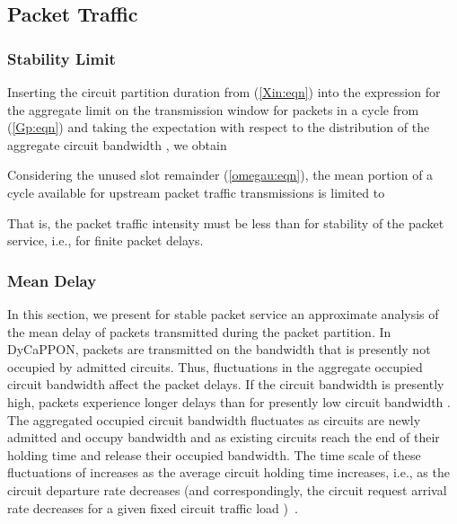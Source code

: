 \documentclass[article]{IEEEtran}
\begin{document}
\subsection{Packet Traffic}
\label{pkt_perf:sec}
\subsubsection{Stability Limit}
\label{pastab:sec}
Inserting the circuit partition duration  from (\ref{Xin:eqn})
into the expression for the aggregate limit  on the
transmission window for packets in a cycle from (\ref{Gp:eqn})
and taking the expectation  with respect to the distribution
of the aggregate circuit bandwidth , we obtain

Considering the unused slot remainder  (\ref{omegau:eqn}),
the mean portion of a cycle available for
upstream packet traffic transmissions is limited to

That is, the packet traffic intensity  must be less than
 for stability of the packet service, i.e.,
for finite packet delays.

\subsubsection{Mean Delay}
\label{delan:sec}
In this section, we present for stable packet service
an approximate analysis of the mean delay  of packets
transmitted during the packet partition.
In DyCaPPON, packets are transmitted on the bandwidth
that is presently not occupied by admitted circuits.
Thus, fluctuations in the aggregate occupied circuit bandwidth 
affect the packet delays.
If the circuit bandwidth  is presently high,
packets experience longer delays than for presently low
circuit bandwidth .
The aggregated occupied circuit bandwidth  fluctuates
as circuits are newly admitted and occupy bandwidth and as
existing circuits reach the end of their holding time and release
their occupied bandwidth.
The time scale of these fluctuations of  increases
as the average circuit holding time  increases,
i.e., as the circuit departure rate  decreases
(and correspondingly, the circuit request arrival rate  decreases
for a given fixed circuit traffic load )~\cite{gaver82}.
\end{document}
